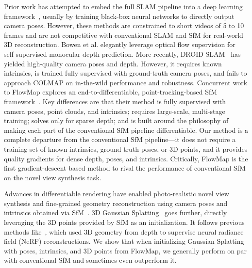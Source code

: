 Prior work has attempted to embed the full SLAM pipeline into a deep learning framework~\cite{tang2018ba,czarnowski2020deepfactors,zhou2018deeptam,clark2018learning,ummenhofer2017demon,liu2019neural,teed2018deepv2d,wang2021tartanvo,bloesch2018codeslam}, usually by training black-box neural networks to directly output camera poses. 
However, these methods are constrained to short videos of 5 to 10 frames and are not competitive with conventional SLAM and SfM for real-world 3D reconstruction.
Bowen et al.\cite{bowen2022dimensions} elegantly leverage optical flow supervision for self-supervised monocular depth prediction.
More recently, DROID-SLAM~\cite{teed2021droid} has yielded high-quality camera poses and depth.
However, it requires known intrinsics, is trained fully supervised with ground-truth camera poses, and fails to approach COLMAP on in-the-wild performance and robustness.
Concurrent work to FlowMap explores an end-to-differentiable, point-tracking-based SfM framework~\cite{wang2023visual}.
Key differences are that their method is fully supervised with camera poses, point clouds, and intrinsics; requires large-scale, multi-stage training; solves only for sparse depth; and is built around the philosophy of making each part of the conventional SfM pipeline differentiable.
Our method is a complete departure from the conventional SfM pipeline---it does not require a training set of known intrinsics, ground-truth poses, or 3D points, and it provides quality gradients for dense depth, poses, and intrinsics.
Critically, FlowMap is the first gradient-descent based method to rival the performance of conventional SfM on the novel view synthesis task.

Advances in differentiable rendering have enabled photo-realistic novel view synthesis and fine-grained geometry reconstruction using camera poses and intrinsics obtained via SfM~\cite{mildenhall2020nerf, li2023neuralangelo, mueller2022instant, sitzmann2019deepvoxels, sitzmann2019scene, niemeyer2020differentiable}. 
3D Gaussian Splatting~\cite{kerbl20233d} goes further, directly leveraging the 3D points provided by SfM as an initialization.
It follows previous methods like~\cite{dsnerf}, which used 3D geometry from depth to supervise neural radiance field (NeRF) reconstructions.
We show that when initializing Gaussian Splatting with poses, intrinsics, and 3D points from FlowMap, we generally perform on par with conventional SfM and sometimes even outperform it.

